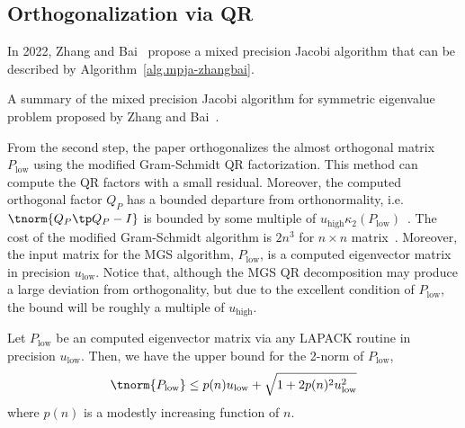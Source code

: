 \documentclass{article}
\numberwithin{equation}{section} %
\begin{document}
\subsection{Orthogonalization via QR}
\label{sec.orth-via-qr}

In 2022, Zhang and Bai~ propose a mixed precision Jacobi
algorithm that can be described by Algorithm~\ref{alg.mpja-zhangbai}.
\begin{algorithm}
\caption{A summary of the mixed precision Jacobi algorithm for symmetric
  eigenvalue problem proposed by Zhang and Bai~.} 
\label{alg.mpja-zhangbai}
\begin{algorithmic}[1]
\end{algorithmic}
\end{algorithm}

From the second step, the paper orthogonalizes the almost orthogonal
matrix $P_{\mathrm{low}}$ using the modified Gram-Schmidt QR factorization.
This method can compute the QR factors with a small residual.
Moreover, the computed orthogonal factor $Q_{P}$ has a bounded departure from
orthonormality, i.e. $\tnorm{Q_{P}\tp Q_{P} - I}$ is bounded by some multiple
of $u_{\mathrm{high}}\kappa_{2}(P_{\mathrm{low}})$~.   
The cost of the modified Gram-Schmidt algorithm is $2n^{3}$ for $n\times n$
matrix~.
Moreover, the input matrix for the MGS algorithm, $P_{\mathrm{low}}$, is a
computed eigenvector matrix in precision $u_{\mathrm{low}}$. Notice that,
although the MGS QR decomposition may produce a large deviation from
orthogonality, but due to the excellent condition of $P_{\mathrm{low}}$,
the bound will be roughly a multiple of $u_{\mathrm{high}}$.

\begin{theorem}
\label{thm.bound-on-norm-Plow}
Let $P_{\mathrm{low}}$ be an computed eigenvector matrix via any LAPACK
routine in precision $u_{\mathrm{low}}$. Then, we have the upper bound for
the 2-norm of $P_{\mathrm{low}}$,
\begin{equation}\notag
  \tnorm{P_{\mathrm{low}}} \le 
  p(n)u_{\mathrm{low}} + \sqrt{1 + 2p(n)^{2}u_{\mathrm{low}}^{2}}
\end{equation}
where $p(n)$ is a modestly increasing function of $n$.
\end{theorem}
\end{document}
